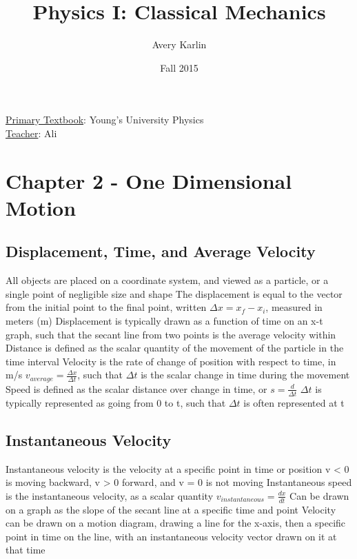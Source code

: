 \documentclass[11 pt, twoside]{article}
\newenvironment{outline*}
{
	\begin{outline}[enumerate]
	}
	{\end{outline}
}
\begin{document}
\title{Physics I: Classical Mechanics}
\author{Avery Karlin}
\date{Fall 2015}
\newcommand{\textbook}{Young's University Physics}
\newcommand{\teacher}{Ali}

\maketitle
\newpage
\hypertarget{content}{\tableofcontents}
\vspace{11pt}
\noindent
\underline{Primary Textbook}: \textbook\\
\underline{Teacher}: \teacher
\newpage

\section{Chapter 2 - One Dimensional Motion}
\subsection{Displacement, Time, and Average Velocity}
\begin{outline*}
\1 All objects are placed on a coordinate system, and viewed as a particle, or a single point of negligible size and shape
\1 The displacement is equal to the vector from the initial point to the final point, written $\Delta x = x_f - x_i$, measured in meters (m)
\2 Displacement is typically drawn as a function of time on an x-t graph, such that the secant line from two points is the average velocity within
\2 Distance is defined as the scalar quantity of the movement of the particle in the time interval
\1 Velocity is the rate of change of position with respect to time, in m/s
\1 $v_{average} = \frac{\Delta x}{\Delta t}$, such that $\Delta t$ is the scalar change in time during the movement
\2 Speed is defined as the scalar distance over change in time, or $s = \frac{d}{\Delta t}$
\2 $\Delta t$ is typically represented as going from 0 to t, such that $\Delta t$ is often represented at t
\end{outline*}
\subsection{Instantaneous Velocity}
\begin{outline*}
\1 Instantaneous velocity is the velocity at a specific point in time or position
\2 v < 0 is moving backward, v > 0 forward, and v = 0 is not moving
\2 Instantaneous speed is the instantaneous velocity, as a scalar quantity
\1 $v_{instantaneous} = \frac{dx}{dt}$
\2 Can be drawn on a graph as the slope of the secant line at a specific time and point
\1 Velocity can be drawn on a motion diagram, drawing a line for the x-axis, then a specific point in time on the line, with an instantaneous velocity vector drawn on it at that time
\end{outline*}
\end{document}
